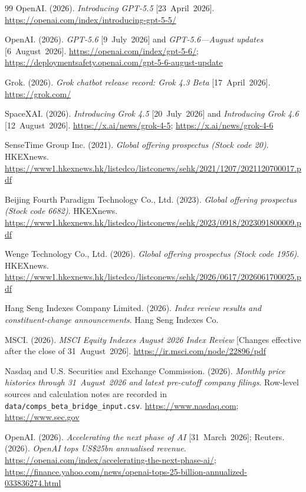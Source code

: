 \documentclass[11pt]{article}
\begin{document}
\begin{thebibliography}{99}
OpenAI. (2026). \emph{Introducing GPT-5.5} [23~April~2026].
\url{https://openai.com/index/introducing-gpt-5-5/}

OpenAI. (2026). \emph{GPT-5.6} [9~July~2026] and \emph{GPT-5.6---August updates}
[6~August~2026]. \url{https://openai.com/index/gpt-5-6/};
\url{https://deploymentsafety.openai.com/gpt-5-6-august-update}

Grok. (2026). \emph{Grok chatbot release record: Grok 4.3 Beta} [17~April~2026].
\url{https://grok.com/}

SpaceXAI. (2026). \emph{Introducing Grok 4.5} [20~July~2026] and
\emph{Introducing Grok 4.6} [12~August~2026].
\url{https://x.ai/news/grok-4-5}; \url{https://x.ai/news/grok-4-6}

SenseTime Group Inc. (2021). \emph{Global offering prospectus (Stock code 20)}. HKEXnews.
\url{https://www1.hkexnews.hk/listedco/listconews/sehk/2021/1207/2021120700017.pdf}

Beijing Fourth Paradigm Technology Co., Ltd. (2023). \emph{Global offering prospectus (Stock code 6682)}.
HKEXnews.
\url{https://www1.hkexnews.hk/listedco/listconews/sehk/2023/0918/2023091800009.pdf}

Wenge Technology Co., Ltd. (2026). \emph{Global offering prospectus (Stock code 1956)}.
HKEXnews.
\url{https://www1.hkexnews.hk/listedco/listconews/sehk/2026/0617/2026061700025.pdf}

Hang Seng Indexes Company Limited. (2026). \emph{Index review results and constituent-change announcements}.
Hang Seng Indexes Co.

MSCI. (2026). \emph{MSCI Equity Indexes August 2026 Index Review} [Changes effective after the close of
31~August~2026]. \url{https://ir.msci.com/node/22896/pdf}

Nasdaq and U.S. Securities and Exchange Commission. (2026). \emph{Monthly price histories through
31~August~2026 and latest pre-cutoff company filings}. Row-level sources and calculation notes are recorded in
\texttt{data/comps\_beta\_bridge\_input.csv}. \url{https://www.nasdaq.com}; \url{https://www.sec.gov}

OpenAI. (2026). \emph{Accelerating the next phase of AI} [31~March~2026]; Reuters. (2026).
\emph{OpenAI tops US\$25bn annualised revenue}. \url{https://openai.com/index/accelerating-the-next-phase-ai/};
\url{https://finance.yahoo.com/news/openai-tops-25-billion-annualized-033836274.html}


\end{thebibliography}
\end{document}
